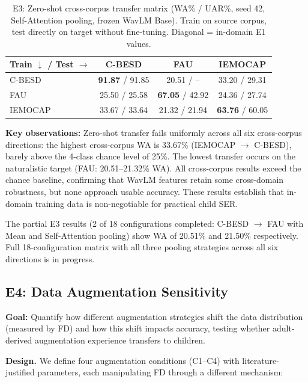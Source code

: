 \documentclass[11pt,a4paper]{article}
\begin{document}
\begin{table}[t]
\centering
\caption{E3: Zero-shot cross-corpus transfer matrix (WA\% / UAR\%, seed 42, Self-Attention pooling, frozen WavLM Base). Train on source corpus, test directly on target without fine-tuning. Diagonal = in-domain E1 values.}
\label{tab:e3}
\begin{tabular}{lccc}
\toprule
\textbf{Train $\downarrow$ / Test $\rightarrow$} & \textbf{C-BESD} & \textbf{FAU} & \textbf{IEMOCAP} \\
\midrule
C-BESD   & \textbf{91.87} / 91.85 & 20.51 / -- & 33.20 / 29.31 \\
FAU      & 25.50 / 25.58 & \textbf{67.05} / 42.92 & 24.36 / 27.74 \\
IEMOCAP  & 33.67 / 33.64 & 21.32 / 21.94 & \textbf{63.76} / 60.05 \\
\bottomrule
\end{tabular}
\end{table}

\noindent\textbf{Key observations:} Zero-shot transfer fails uniformly across
all six cross-corpus directions: the highest cross-corpus WA is 33.67\%
(IEMOCAP $\rightarrow$ C-BESD), barely above the 4-class chance level of 25\%.
The lowest transfer occurs on the naturalistic target (FAU: 20.51--21.32\% WA).
All cross-corpus results exceed the chance baseline, confirming that WavLM
features retain some cross-domain robustness, but none approach usable accuracy.
These results establish that in-domain training data is non-negotiable for
practical child SER.

The partial E3 results (2 of 18 configurations completed: C-BESD $\rightarrow$
FAU with Mean and Self-Attention pooling) show WA of 20.51\% and 21.50\%
respectively. Full 18-configuration matrix with all three pooling strategies
across all six directions is in progress.

\subsection{E4: Data Augmentation Sensitivity}
\label{ssec:e4}

\textbf{Goal:} Quantify how different augmentation strategies shift the data
distribution (measured by FD) and how this shift impacts accuracy, testing
whether adult-derived augmentation experience transfers to children.

\textbf{Design.} We define four augmentation conditions (C1--C4) with
literature-justified parameters, each manipulating FD through a different
mechanism:
\end{document}
